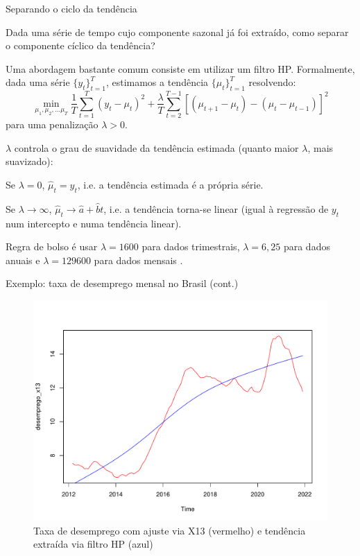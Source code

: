 \documentclass[11pt]{beamer}
\newenvironment{halfwideitemize}{\itemize\addtolength{\itemsep}{0.5em}}{\enditemize}
\newenvironment{halfwideenumerate}{\enumerate\addtolength{\itemsep}{0.5em}}{\endenumerate}
\begin{document}
\begin{frame}{Separando o ciclo da tendência}
	\begin{halfwideitemize}
		\item Dada uma série de tempo cujo componente sazonal já foi extraído, como separar o componente cíclico da tendência?
		\item Uma abordagem bastante comum consiste em utilizar um {\color{blue}filtro HP}. Formalmente, dada uma série $\{y_t\}_{t=1}^T$,  estimamos a tendência $\{\mu_t\}_{t=1}^T$ resolvendo:
		\begin{equation}
			\min_{\mu_1, \mu_2,\ldots \mu_T} \frac{1}{T} \sum_{t=1}^{T} (y_t - \mu_t)^2 + \frac{\lambda}{T} \sum_{t=2}^{T-1}[(\mu_{t+1}-\mu_t) -(\mu_t - \mu_{t-1})]^2
		\end{equation}
		para uma {\color{blue}penalização} $\lambda > 0$.
		\item $\lambda$ controla o grau de suavidade da tendência estimada (quanto maior $\lambda$, mais suavizado):
		\begin{halfwideenumerate}
			\item Se $\lambda  = 0$, $\hat{\mu}_t = y_t$, i.e. a tendência estimada é a própria série.
			\item Se $\lambda \to \infty$, $\hat{\mu}_t \to \hat{a} + \hat{b} t$, i.e. a tendência torna-se linear (igual à regressão de $y_t$ num intercepto e numa tendência linear).
		\end{halfwideenumerate}
		\item Regra de bolso é usar $\lambda = 1600$ para dados trimestrais, $\lambda =  6,25$ para dados anuais e $\lambda = 129600$ para dados mensais \citep{Ravn2002}.
	\end{halfwideitemize}
\end{frame}



\begin{frame}{Exemplo: taxa de desemprego mensal no Brasil (cont.)}
	\begin{figure}
		\caption{Taxa de desemprego com ajuste via X13 (vermelho) e tendência extraída via filtro HP (azul)}
		\includegraphics[scale=0.4]{graficos/desemprego_hp.pdf}
	\end{figure}
\end{frame}
\end{document}
